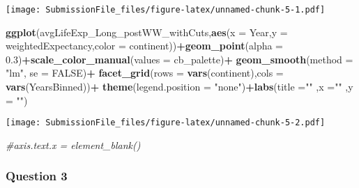 \documentclass[]{article}
\newenvironment{Shaded}{\begin{snugshade}}{\end{snugshade}}
\newcommand{\CommentTok}[1]{\textcolor[rgb]{0.56,0.35,0.01}{\textit{#1}}}
\newcommand{\DataTypeTok}[1]{\textcolor[rgb]{0.13,0.29,0.53}{#1}}
\newcommand{\FloatTok}[1]{\textcolor[rgb]{0.00,0.00,0.81}{#1}}
\newcommand{\KeywordTok}[1]{\textcolor[rgb]{0.13,0.29,0.53}{\textbf{#1}}}
\newcommand{\NormalTok}[1]{#1}
\newcommand{\OperatorTok}[1]{\textcolor[rgb]{0.81,0.36,0.00}{\textbf{#1}}}
\newcommand{\OtherTok}[1]{\textcolor[rgb]{0.56,0.35,0.01}{#1}}
\newcommand{\StringTok}[1]{\textcolor[rgb]{0.31,0.60,0.02}{#1}}
\begin{document}
\texttt{[image: SubmissionFile\_files/figure-latex/unnamed-chunk-5-1.pdf]}

\begin{Shaded}
\begin{Highlighting}[]
\KeywordTok{ggplot}\NormalTok{(avgLifeExp_Long_postWW_withCuts,}\KeywordTok{aes}\NormalTok{(}\DataTypeTok{x =}\NormalTok{ Year,}\DataTypeTok{y =}\NormalTok{ weightedExpectancy,}\DataTypeTok{color =}\NormalTok{ continent))}\OperatorTok{+}\KeywordTok{geom_point}\NormalTok{(}\DataTypeTok{alpha =} \FloatTok{0.3}\NormalTok{)}\OperatorTok{+}\KeywordTok{scale_color_manual}\NormalTok{(}\DataTypeTok{values =}\NormalTok{ cb_palette)}\OperatorTok{+}
\StringTok{  }\KeywordTok{geom_smooth}\NormalTok{(}\DataTypeTok{method =} \StringTok{"lm"}\NormalTok{, }\DataTypeTok{se =} \OtherTok{FALSE}\NormalTok{)}\OperatorTok{+}\StringTok{ }
\StringTok{  }\KeywordTok{facet_grid}\NormalTok{(}\DataTypeTok{rows =} \KeywordTok{vars}\NormalTok{(continent),}\DataTypeTok{cols =} \KeywordTok{vars}\NormalTok{(YearsBinned))}\OperatorTok{+}
\StringTok{  }\KeywordTok{theme}\NormalTok{(}\DataTypeTok{legend.position =} \StringTok{"none"}\NormalTok{)}\OperatorTok{+}\KeywordTok{labs}\NormalTok{(}\DataTypeTok{title =}\StringTok{""}\NormalTok{ ,}\DataTypeTok{x =}\StringTok{""}\NormalTok{ ,}\DataTypeTok{y =} \StringTok{""}\NormalTok{)}
\end{Highlighting}
\end{Shaded}

\texttt{[image: SubmissionFile\_files/figure-latex/unnamed-chunk-5-2.pdf]}

\begin{Shaded}
\begin{Highlighting}[]
\CommentTok{#axis.text.x = element_blank()}
\end{Highlighting}
\end{Shaded}

\hypertarget{question-3}{%
\subsubsection{Question 3}\label{question-3}}
\end{document}

